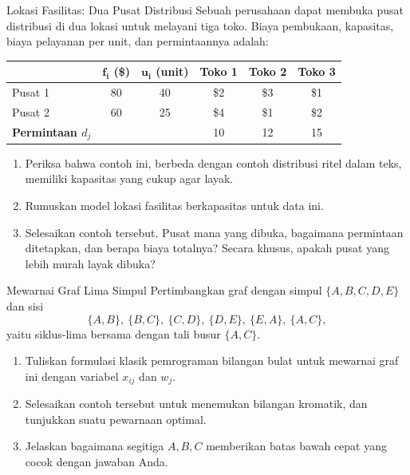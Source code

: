 \begin{ex}{Lokasi Fasilitas: Dua Pusat Distribusi}{}
\label{ex:facility-small}
 Sebuah perusahaan dapat membuka pusat distribusi di dua lokasi untuk melayani tiga toko. Biaya pembukaan, kapasitas, biaya pelayanan per unit, dan permintaannya adalah:

\begin{center}
\begin{tabular}{lcc|ccc}
\toprule
 & \(\mathbf{f_i}\) (\$) & \(\mathbf{u_i}\) (unit) & Toko 1 & Toko 2 & Toko 3 \\
\midrule
Pusat 1 & 80 & 40 & \$2 & \$3 & \$1 \\
Pusat 2 & 60 & 25 & \$4 & \$1 & \$2 \\
\midrule
\textbf{Permintaan \(d_j\)} & & & 10 & 12 & 15 \\
\bottomrule
\end{tabular}
\par{}\label{tab:integerProgrammingFormulations-book1-tab06}%

\end{center}

\begin{enumerate}
\item Periksa bahwa contoh ini, berbeda dengan contoh distribusi ritel dalam teks, memiliki kapasitas yang cukup agar layak.
\item Rumuskan model lokasi fasilitas berkapasitas untuk data ini.
\item Selesaikan contoh tersebut. Pusat mana yang dibuka, bagaimana permintaan ditetapkan, dan berapa biaya totalnya? Secara khusus, apakah pusat yang lebih murah layak dibuka?
\end{enumerate}
\exrefs{\S\ref{sec:facility-location}}
\end{ex}

\begin{ex}{Mewarnai Graf Lima Simpul}{}
\label{ex:graph-coloring-5}
 Pertimbangkan graf dengan simpul $\{A, B, C, D, E\}$ dan sisi
\[
\{A,B\},\ \{B,C\},\ \{C,D\},\ \{D,E\},\ \{E,A\},\ \{A,C\},
\]
yaitu siklus-lima bersama dengan tali busur $\{A,C\}$.
\begin{enumerate}
\item Tuliskan formulasi klasik pemrograman bilangan bulat untuk mewarnai graf ini dengan variabel $x_{ij}$ dan $w_j$.
\item Selesaikan contoh tersebut untuk menemukan bilangan kromatik, dan tunjukkan suatu pewarnaan optimal.
\item Jelaskan bagaimana segitiga $A, B, C$ memberikan batas bawah cepat yang cocok dengan jawaban Anda.
\end{enumerate}
\exrefs{\S\ref{sec:graph-coloring}}
\end{ex}

